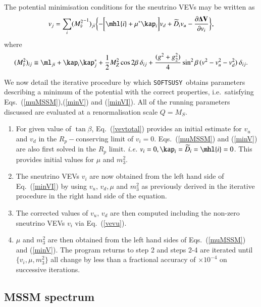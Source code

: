 \documentclass[final,3p,times,pdflatex]{elsarticle}
\def\SOFTSUSY{{\tt SOFTSUSY}}
\begin{document}
The potential minimisation conditions for the sneutrino VEVs may be
written as
\begin{equation}
v_j = \sum_i({M_{\tilde{\nu}}^2}^{-1})_{ji}\biggl \{ -\biggl [ \mhl{i}+\mu^*\kap_i \biggr ]
v_d + \widetilde{D}_i v_u -\frac{\partial 
{\bf \Delta V}}{\partial v_i} \biggr \}, \label{minVI}
\end{equation}
where
\begin{equation}
(M_{\tilde{\nu}}^2)_{ij} \equiv \ml_{ji}+\kap_i\kap_j^* +\frac{1}{2}
M_Z^2 \cos2\beta \: \delta_{ij} 
+\frac{(g^2+g_2^2)}{4} 
\sin^2\beta\, (v^2-v_u^2-v_d^2)\: \delta_{ij}.
\end{equation}

We now detail the iterative procedure 
by which \SOFTSUSY~obtains parameters describing a
minimum of the potential with the correct properties, i.e.\ satisfying
Eqs.~(\ref{muMSSM}),(\ref{minV}) and (\ref{minVI}). All of the running
parameters discussed are evaluated at 
a renormalisation scale $Q=M_S$. 
\begin{enumerate}
\item
For given value of $\tan \beta$, 
Eq.~(\ref{vevtotal})
provides an initial estimate for $v_u$ and $v_d$ in the $R_p-$conserving limit
of $v_i=0$.  
Eqs.~(\ref{muMSSM}) and (\ref{minV}) are also first solved in the $R_p$
limit. 
\textit{i.e.} 
$v_i=0,\kap_i=\widetilde{D}_i=\mhl{i}=0$. This provides initial values
for $\mu$ and $m_3^2$. 
\item
The sneutrino VEVs $v_i$ are now obtained from the left hand side of
Eq.~(\ref{minVI})  
by using $v_u,\,v_d, \mu$ and $m_3^2$ as 
previously derived in the iterative procedure in the right hand side of the
equation. 
\item
The
corrected values of $v_u,\,v_d$ are then computed including the
non-zero sneutrino VEVs $v_i$ via Eq.~(\ref{vevu}). 
\item
$\mu$ and 
$m_3^2$ are then obtained from the left hand sides of 
Eqs.~(\ref{muMSSM}) and (\ref{minV}). The program returns to step 2 and steps
2-4 are iterated until 
$\{ v_i, \mu, m_3^2 \}$ all change by less
than a fractional accuracy of $\times 10^{-4}$ on successive
iterations.  
\end{enumerate}


\subsection{MSSM spectrum \label{spec}}
\end{document}
